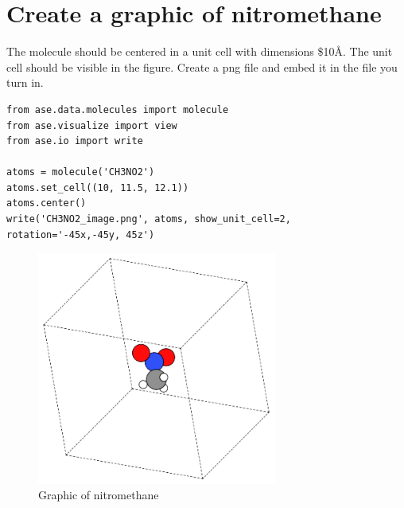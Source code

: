 \documentclass[11pt]{article}
\begin{document}
\section{Create a graphic of nitromethane}
\label{sec-7}

The molecule should be centered in a unit cell with dimensions
\$10\texttimes{}\AA{}. The unit cell should be visible in the
figure. Create a png file and embed it in the file you turn in.


\begin{verbatim}
from ase.data.molecules import molecule
from ase.visualize import view
from ase.io import write

atoms = molecule('CH3NO2')
atoms.set_cell((10, 11.5, 12.1))
atoms.center()
write('CH3NO2_image.png', atoms, show_unit_cell=2, rotation='-45x,-45y, 45z')
\end{verbatim}

\begin{figure}[H]
\centering
\includegraphics[width=0.7\textwidth]{./CH3NO2_image.png}
\caption{Graphic of nitromethane}
\end{figure}
\end{document}
